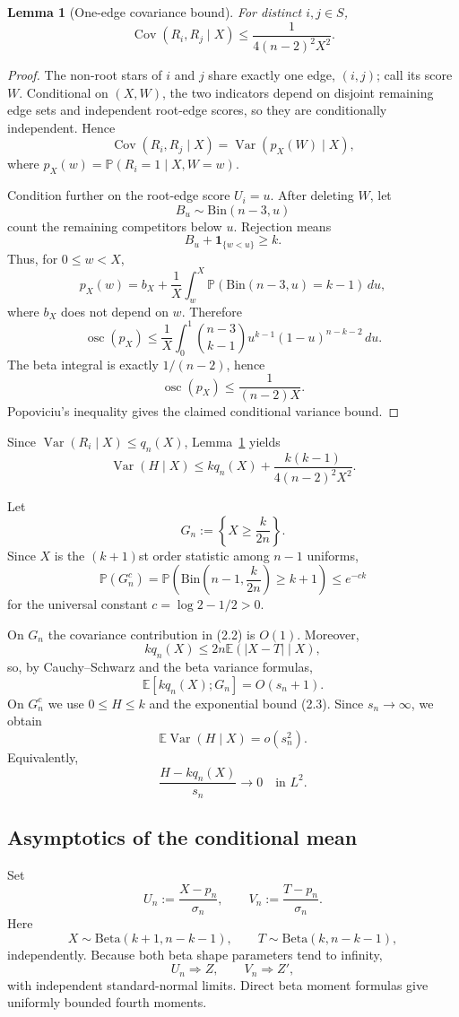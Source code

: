 \documentclass[11pt]{article}
\newtheorem{lemma}[theorem]{Lemma}
\theoremstyle{remark}
\newcommand{\E}{\mathbb E}
\newcommand{\Pp}{\mathbb P}
\newcommand{\Var}{\operatorname{Var}}
\newcommand{\Cov}{\operatorname{Cov}}
\newcommand{\1}{\mathbf 1}
\begin{document}
\begin{lemma}[One-edge covariance bound]\label{lem:cov}
For distinct $i,j\in S$,
\[
\Cov(R_i,R_j\mid X)
\le
\frac{1}{4(n-2)^2X^2}.
\]
\end{lemma}

\begin{proof}
The non-root stars of $i$ and $j$ share exactly one edge, $(i,j)$; call its score $W$. Conditional on $(X,W)$, the two indicators depend on disjoint remaining edge sets and independent root-edge scores, so they are conditionally independent. Hence
\[
\Cov(R_i,R_j\mid X)=\Var(p_X(W)\mid X),
\]
where $p_X(w)=\Pp(R_i=1\mid X,W=w)$.

Condition further on the root-edge score $U_i=u$. After deleting $W$, let
\[
B_u\sim\mathrm{Bin}(n-3,u)
\]
count the remaining competitors below $u$. Rejection means
\[
B_u+\1_{\{w<u\}}\ge k.
\]
Thus, for $0\le w<X$,
\[
p_X(w)=b_X+\frac1X\int_w^X
\Pp(\mathrm{Bin}(n-3,u)=k-1)\,du,
\]
where $b_X$ does not depend on $w$. Therefore
\[
\operatorname{osc}(p_X)
\le \frac1X\int_0^1
\binom{n-3}{k-1}u^{k-1}(1-u)^{n-k-2}\,du.
\]
The beta integral is exactly $1/(n-2)$, hence
\[
\operatorname{osc}(p_X)\le \frac{1}{(n-2)X}.
\]
Popoviciu's inequality gives the claimed conditional variance bound.
\end{proof}

Since $\Var(R_i\mid X)\le q_n(X)$, Lemma~\ref{lem:cov} yields
\[
\Var(H\mid X)
\le kq_n(X)+\frac{k(k-1)}{4(n-2)^2X^2}.
\tag{2.2}
\]

Let
\[
G_n:=\left\{X\ge \frac{k}{2n}\right\}.
\]
Since $X$ is the $(k+1)$st order statistic among $n-1$ uniforms,
\[
\Pp(G_n^c)
=
\Pp\left(\mathrm{Bin}\left(n-1,\frac{k}{2n}\right)\ge k+1\right)
\le e^{-c k}
\tag{2.3}
\]
for the universal constant $c=\log 2-1/2>0$.

On $G_n$ the covariance contribution in (2.2) is $O(1)$. Moreover,
\[
kq_n(X)
\le 2n\E(|X-T|\mid X),
\]
so, by Cauchy--Schwarz and the beta variance formulas,
\[
\E[kq_n(X);G_n]=O(s_n+1).
\]
On $G_n^c$ we use $0\le H\le k$ and the exponential bound (2.3). Since $s_n\to\infty$, we obtain
\[
\E\Var(H\mid X)=o(s_n^2).
\]
Equivalently,
\[
\frac{H-kq_n(X)}{s_n}\longrightarrow0
\quad\text{in }L^2.
\tag{2.4}
\]

\subsection{Asymptotics of the conditional mean}

Set
\[
U_n:=\frac{X-p_n}{\sigma_n},
\qquad
V_n:=\frac{T-p_n}{\sigma_n}.
\]
Here
\[
X\sim\mathrm{Beta}(k+1,n-k-1),
\qquad
T\sim\mathrm{Beta}(k,n-k-1),
\]
independently. Because both beta shape parameters tend to infinity,
\[
U_n\Longrightarrow Z,
\qquad
V_n\Longrightarrow Z',
\]
with independent standard-normal limits. Direct beta moment formulas give uniformly bounded fourth moments.
\end{document}
